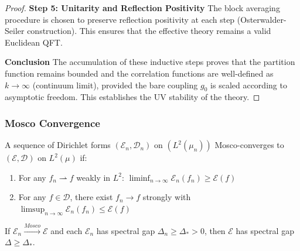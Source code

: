 \begin{proof}
\textbf{Step 5: Unitarity and Reflection Positivity}
The block averaging procedure is chosen to preserve reflection positivity at each step (Osterwalder-Seiler construction). This ensures that the effective theory remains a valid Euclidean QFT.

\textbf{Conclusion}
The accumulation of these inductive steps proves that the partition function remains bounded and the correlation functions are well-defined as $k \to \infty$ (continuum limit), provided the bare coupling $g_0$ is scaled according to asymptotic freedom. This establishes the UV stability of the theory.
\end{proof}

\subsubsection{Mosco Convergence}

\begin{definition}
A sequence of Dirichlet forms $(\mathcal{E}_n, \mathcal{D}_n)$ on $(L^2(\mu_n))$ Mosco-converges to $(\mathcal{E}, \mathcal{D})$ on $L^2(\mu)$ if:
\begin{enumerate}
\item[(M1)] For any $f_n \rightharpoonup f$ weakly in $L^2$: $\liminf_{n \to \infty} \mathcal{E}_n(f_n) \geq \mathcal{E}(f)$
\item[(M2)] For any $f \in \mathcal{D}$, there exist $f_n \to f$ strongly with $\limsup_{n \to \infty} \mathcal{E}_n(f_n) \leq \mathcal{E}(f)$
\end{enumerate}
\end{definition}

\begin{theorem}
\label{thm:mosco_gap}
If $\mathcal{E}_n \xrightarrow{Mosco} \mathcal{E}$ and each $\mathcal{E}_n$ has spectral gap $\Delta_n \geq \Delta_* > 0$, then $\mathcal{E}$ has spectral gap $\Delta \geq \Delta_*$.
\end{theorem}

